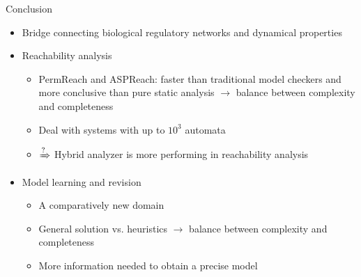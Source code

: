 \documentclass[8pt]{beamer}
\begin{document}
\begin{frame}{Conclusion}
\begin{itemize}
    \item<+-> Bridge connecting biological regulatory networks and dynamical properties
    \item<+-> Reachability analysis
    \begin{itemize}
        \item<+-> PermReach and ASPReach: faster than traditional model checkers and more conclusive than pure static analysis $\to$ balance between complexity and completeness
        \item<+-> Deal with systems with up to $10^3$ automata
        \item<+-> $\xRightarrow{\text{?}}$ Hybrid analyzer is more performing in reachability analysis
    \end{itemize}
    \item<+-> Model learning and revision
    \begin{itemize}
        \item<+-> A comparatively new domain
        \item<+-> General solution vs. heuristics $\to$ balance between complexity and completeness
        \item<+-> More information needed to obtain a precise model 
    \end{itemize}
\end{itemize}
\end{frame}
\end{document}
